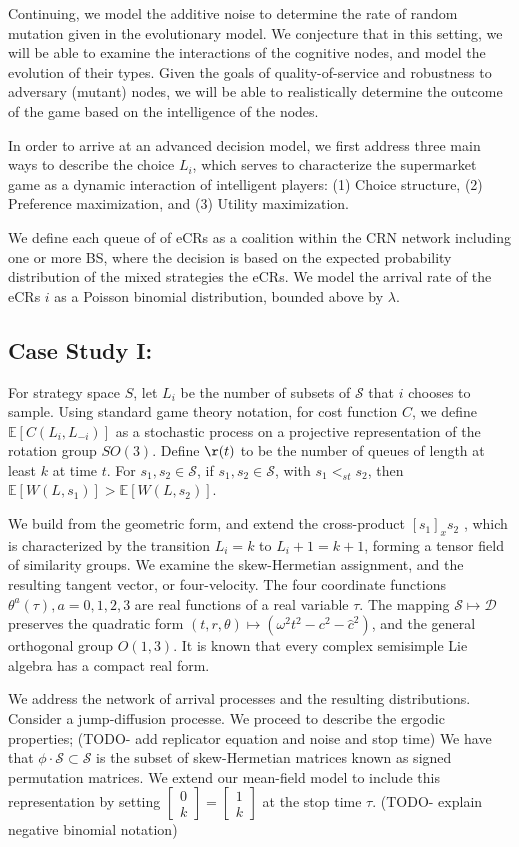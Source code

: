 \documentclass[10pt]{article}
\newcommand{\mcS}{\mathcal{S}}
\newcommand{\mcD}{\mathcal{D}}
\theoremstyle{definition}
\begin{document}
Continuing, we model the additive noise to determine the rate of random mutation given in the evolutionary model. 
We conjecture that in this setting, we will be able to examine the interactions of the cognitive nodes, and model the evolution of their types. Given the goals of quality-of-service and robustness to adversary (mutant) nodes, we will be able to realistically determine the outcome of the game based on the intelligence of the nodes.

In order to arrive at an advanced decision model, we first
address three main ways to describe the choice $L_i$, which serves to characterize the supermarket game
as a dynamic interaction of intelligent players: (1) Choice structure, (2) Preference maximization,
and (3) Utility maximization.

We define each queue of of eCRs as a coalition
within the CRN network including one or more BS, where the decision is based on the expected
probability distribution of the mixed strategies the eCRs. We model the arrival
rate of the eCRs $i$ as a Poisson binomial distribution, bounded above by $\lambda$.

\subsection{Case Study I:}
For strategy space $S$,
let $L_i$ be the number of subsets of $\mcS$ that $i$ chooses to sample.
Using standard game theory notation, for cost function $C$, we define
$\mathbb{E}[C(L_i, L_{-i})]$ as a stochastic process on a projective
representation of the rotation group $SO(3)$. 
Define $\r(t)$ to be the number of queues of length at least $k$ at time $t$.
For $s_1, s_2 \in \mcS$, if $s_1,s_2 \in \mcS$, with $s_1 <_{st} s_2$, then
$\mathbb{E}[W(L,s_1)] > \mathbb{E}[W(L,s_2)]$.

We build from the geometric form, and
extend the cross-product $[s_1 ]_x s_2$ , which is characterized by the transition $L_i = k$ to $L_i+1 = k + 1$, forming a tensor field of similarity groups.
We examine the skew-Hermetian assignment, and the resulting tangent vector, or four-velocity. 
The four coordinate functions $\theta^a (\tau), a = 0, 1, 2, 3$ are real
functions of a real variable $\tau$. The mapping $\mcS\mapsto \mcD$ preserves the quadratic form $(t, r,
\theta)\mapsto (\omega^2 t^2-c^2-\hat c^2)$, and the general orthogonal group $O(1,3)$.
 It is known that every complex semisimple Lie algebra has a compact real form.

We address the network of arrival processes and the resulting distributions.
Consider a jump-diffusion processe. We proceed to describe the ergodic
properties; (TODO- add replicator equation and noise and stop time)
We have that $\phi\cdot \mcS\subset \mcS$ is the subset of skew-Hermetian matrices known as signed
permutation matrices. We extend our mean-field model to include this
representation by setting $\begin{bmatrix}0 \\ k\end{bmatrix} = \begin{bmatrix}1
\\
k\end{bmatrix}$ at the stop time $\tau$. (TODO- explain negative binomial
notation)
\end{document}
